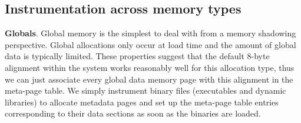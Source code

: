 \subsection{Instrumentation across memory types}
\label{sec:assumptions}

\textbf{Globals}. Global memory is the simplest to deal with from a memory shadowing perspective. Global allocations only occur at load time and the amount of global data is typically
limited. These properties suggest that the default 8-byte alignment within the system works reasonably well for this allocation type, thus we can just associate every global data memory page with this alignment in the meta-page table.
We simply instrument binary files (executables and dynamic libraries) to allocate metadata pages and set up the meta-page table entries corresponding to their data sections as soon as the binaries are loaded.


